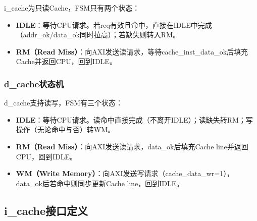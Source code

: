 i\_cache为只读Cache，FSM只有两个状态：

\begin{itemize}
    \item \textbf{IDLE}：等待CPU请求。若req有效且命中，直接在IDLE中完成（addr\_ok/data\_ok同时拉高）；若缺失则转入RM。
    \item \textbf{RM（Read Miss）}：向AXI发送读请求，等待cache\_inst\_data\_ok后填充Cache并返回CPU，回到IDLE。
\end{itemize}

\subsubsection{d\_cache状态机}

d\_cache支持读写，FSM有三个状态：

\begin{itemize}
    \item \textbf{IDLE}：等待CPU请求。读命中直接完成（不离开IDLE）；读缺失转RM；写操作（无论命中与否）转WM。
    \item \textbf{RM（Read Miss）}：向AXI发送读请求，data\_ok后填充Cache line并返回CPU，回到IDLE。
    \item \textbf{WM（Write Memory）}：向AXI发送写请求（cache\_data\_wr=1），data\_ok后若命中则同步更新Cache line，回到IDLE。
\end{itemize}

\subsection{i\_cache接口定义}

